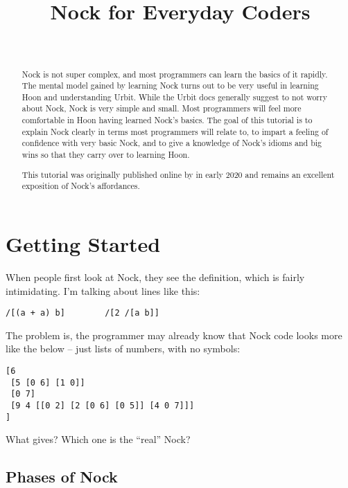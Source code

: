 \documentclass[twoside]{article}
\title{Nock for Everyday Coders}
\author{\authorname~\authorpatp \\ \affiliation}
\date{}
\begin{document}
\maketitle
\thispagestyle{firststyle}

\begin{abstract}
  \sloppy
  Nock is not super complex, and most programmers can learn the basics of it rapidly. The mental model gained by learning Nock turns out to be very useful in learning Hoon and understanding \mbox{Urbit}.  While the Urbit docs generally suggest to not worry about Nock, Nock is very simple and small.  Most programmers will feel more comfortable in Hoon having learned Nock's basics.  The goal of this tutorial is to explain Nock clearly in terms most programmers will relate to, to impart a feeling of confidence with very basic Nock, and to give a knowledge of Nock’s idioms and big wins so that they carry over to learning Hoon.

  \sloppy
  This tutorial was originally published online by  in early 2020 and remains an excellent exposition of Nock's affordances.
\end{abstract}

\setcounter{page}{1}

\tableofcontents

\section{Getting Started}

When people first look at Nock, they see the definition, which is fairly intimidating.  I'm talking about lines like this:

\begin{lstlisting}[style=listingcode]
/[(a + a) b]        /[2 /[a b]]
\end{lstlisting}

\noindent
The problem is, the programmer may already know that Nock code looks more like the below – just lists of numbers, with no symbols:

\begin{lstlisting}[style=listingblock]
[6
 [5 [0 6] [1 0]]
 [0 7]
 [9 4 [[0 2] [2 [0 6] [0 5]] [4 0 7]]]
]
\end{lstlisting}

What gives? Which one is the ``real'' Nock?

\subsection{Phases of Nock}
\end{document}
